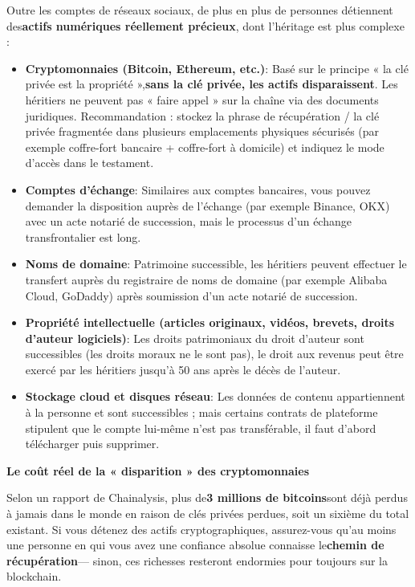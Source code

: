 
Outre les comptes de réseaux sociaux, de plus en plus de personnes détiennent des\textbf{actifs numériques réellement précieux}, dont l'héritage est plus complexe :

\begin{itemize}
  \item \textbf{Cryptomonnaies (Bitcoin, Ethereum, etc.)}: Basé sur le principe « la clé privée est la propriété »,\textbf{sans la clé privée, les actifs disparaissent}. Les héritiers ne peuvent pas « faire appel » sur la chaîne via des documents juridiques. Recommandation : stockez la phrase de récupération / la clé privée fragmentée dans plusieurs emplacements physiques sécurisés (par exemple coffre-fort bancaire + coffre-fort à domicile) et indiquez le mode d'accès dans le testament.
  \item \textbf{Comptes d'échange}: Similaires aux comptes bancaires, vous pouvez demander la disposition auprès de l'échange (par exemple Binance, OKX) avec un acte notarié de succession, mais le processus d'un échange transfrontalier est long.
  \item \textbf{Noms de domaine}: Patrimoine successible, les héritiers peuvent effectuer le transfert auprès du registraire de noms de domaine (par exemple Alibaba Cloud, GoDaddy) après soumission d'un acte notarié de succession.
  \item \textbf{Propriété intellectuelle (articles originaux, vidéos, brevets, droits d'auteur logiciels)}: Les droits patrimoniaux du droit d'auteur sont successibles (les droits moraux ne le sont pas), le droit aux revenus peut être exercé par les héritiers jusqu'à 50 ans après le décès de l'auteur.
  \item \textbf{Stockage cloud et disques réseau}: Les données de contenu appartiennent à la personne et sont successibles ; mais certains contrats de plateforme stipulent que le compte lui-même n'est pas transférable, il faut d'abord télécharger puis supprimer.
\end{itemize}

\textbf{Le coût réel de la « disparition » des cryptomonnaies}\par

Selon un rapport de Chainalysis, plus de\textbf{3 millions de bitcoins}sont déjà perdus à jamais dans le monde en raison de clés privées perdues, soit un sixième du total existant. Si vous détenez des actifs cryptographiques, assurez-vous qu'au moins une personne en qui vous avez une confiance absolue connaisse le\textbf{chemin de récupération}— sinon, ces richesses resteront endormies pour toujours sur la blockchain.

